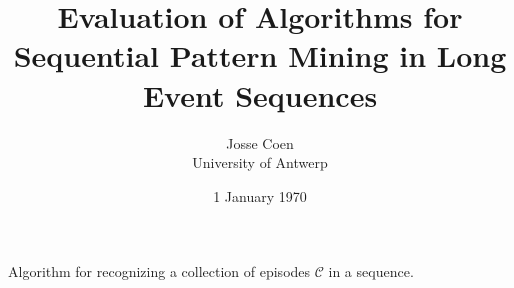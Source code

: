 \documentclass{scrartcl}
\begin{document}
\frenchspacing

\title{Evaluation of Algorithms for Sequential Pattern Mining in Long Event Sequences}
\subtitle{}

\author{Josse Coen
\vspace{.3cm}\\
%
University of Antwerp
%
}

\date{1 January 1970}

\maketitle

Algorithm for recognizing a collection of episodes $ \mathcal{C} $ in a sequence.
\end{document}
